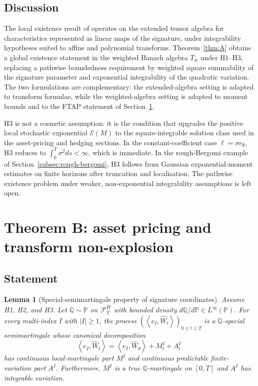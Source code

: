 \documentclass[11pt,oneside]{article}
\theoremstyle{plain}
\newtheorem{lemma}[theorem]{Lemma}
\theoremstyle{definition}
\theoremstyle{remark}
\newcommand{\Q}{\mathbb{Q}}
\newcommand{\Pp}{\mathbb{P}}
\newcommand{\Tw}{T_w}
\newcommand{\cW}{\widehat W}
\newcommand{\FWh}{\mathcal F^{\widehat W}}
\newcommand{\inner}[2]{\left\langle #1,#2\right\rangle}
\begin{document}
\subsection{Discussion}

The local existence result of \citet{CuchieroSvalutoFerroTeichmann2023} operates on the extended tensor algebra for characteristics represented as linear maps of the signature, under integrability hypotheses suited to affine and polynomial transforms. Theorem~\ref{thm:A} obtains a global existence statement in the weighted Banach algebra $\Tw$ under H1--H3, replacing a pathwise boundedness requirement by weighted square summability of the signature parameter and exponential integrability of the quadratic variation. The two formulations are complementary: the extended-algebra setting is adapted to transform formulae, while the weighted-algebra setting is adapted to moment bounds and to the FTAP statement of Section~\ref{sec:theorem-b}.

H3 is not a cosmetic assumption: it is the condition that upgrades the positive local stochastic exponential $\mathcal E(M)$ to the square-integrable solution class used in the asset-pricing and hedging sections. In the constant-coefficient case $\ell=\sigma e_\emptyset$, H3 reduces to $\int_0^T\sigma^2ds<\infty$, which is immediate. In the rough-Bergomi example of Section~\ref{subsec:rough-bergomi}, H3 follows from Gaussian exponential-moment estimates on finite horizons after truncation and localisation. The pathwise existence problem under weaker, non-exponential integrability assumptions is left open.


\section{Theorem B: asset pricing and transform non-explosion}\label{sec:theorem-b}

\subsection{Statement}

\begin{lemma}[Special-semimartingale property of signature coordinates]\label{lem:special-semimartingale}
Assume H1, H2, and H3. Let $\Q\sim\Pp$ on $\FWh_T$ with bounded density $d\Q/d\Pp\in L^\infty(\Pp)$. For every multi-index $I$ with $|I|\geq1$, the process $(\inner{e_I}{\cW_t})_{0\leq t\leq T}$ is a $\Q$-special semimartingale whose canonical decomposition
\[
\inner{e_I}{\cW_t}=\inner{e_I}{\cW_0}+M_t^I+A_t^I
\]
has continuous local-martingale part $M^I$ and continuous predictable finite-variation part $A^I$. Furthermore, $M^I$ is a true $\Q$-martingale on $[0,T]$ and $A^I$ has integrable variation.
\end{lemma}
\end{document}

